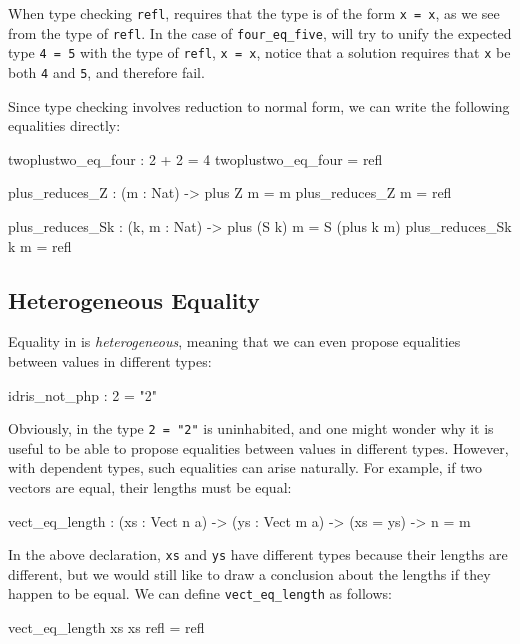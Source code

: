 When type checking \texttt{refl}, \Idris{} requires that the type is of
the form \texttt{x = x}, as we see from the type of \texttt{refl}. In the case
of \texttt{four\_eq\_five}, \Idris{} will try to unify the expected type
\texttt{4 = 5} with the type of \texttt{refl},
\texttt{x = x}, notice that a solution requires that \texttt{x} be both
\texttt{4} and \texttt{5}, and therefore fail.

Since type checking involves reduction to normal form, we can write the
following equalities directly:

\begin{code}
twoplustwo_eq_four : 2 + 2 = 4
twoplustwo_eq_four = refl

plus_reduces_Z : (m : Nat) -> plus Z m = m
plus_reduces_Z m = refl

plus_reduces_Sk : (k, m : Nat) -> plus (S k) m = S (plus k m)
plus_reduces_Sk k m = refl
\end{code}

\subsection{Heterogeneous Equality}

Equality in \Idris{} is \emph{heterogeneous}, meaning that
we can even propose equalities between values in different types:

\begin{code}
idris_not_php : 2 = "2"
\end{code}

\noindent
Obviously, in \Idris{} the type \texttt{2 = "2"} is uninhabited, and one might
wonder why it is useful to be able to propose equalities between values in
different types. However, with dependent types, such equalities can arise
naturally. For example, if two vectors are equal, their lengths must be
equal:

\begin{code}
vect_eq_length : (xs : Vect n a) -> (ys : Vect m a) ->
                 (xs = ys) -> n = m
\end{code}

\noindent
In the above declaration, \texttt{xs} and \texttt{ys} have different types
because their lengths are different,
but we would still like to draw a conclusion about the lengths if they
happen to be equal. We can define \texttt{vect\_eq\_length} as follows:

\begin{code}
vect_eq_length xs xs refl = refl
\end{code}


